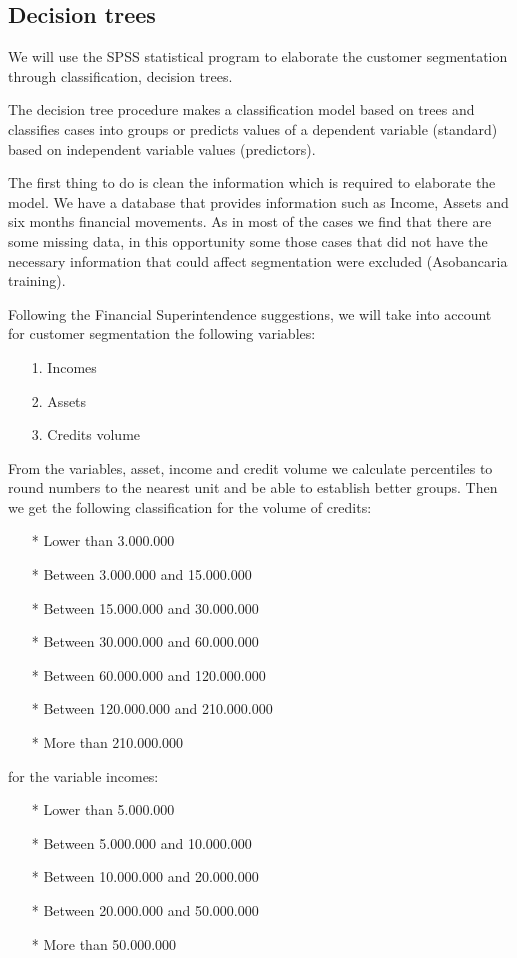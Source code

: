 \subsection{Decision trees}
We will use the SPSS statistical program to elaborate the customer segmentation through classification, decision trees.\par
The decision tree procedure makes a classification model based on trees and classifies cases into groups or predicts values of a dependent variable (standard) based on independent variable values (predictors).\par
The first thing to do is clean the information which is required to elaborate the model. We have a database that provides information such as Income, Assets and six months financial movements. As in most of the cases we find that there are some missing data, in this opportunity some those cases that did not have the necessary information that could affect segmentation were excluded (Asobancaria training).\par
Following the Financial Superintendence suggestions, we will take into account for customer segmentation the following variables:
\begin{itemize}
\item[1.] Incomes
\item[2.] Assets
\item[3.] Credits volume
\end{itemize}
From the variables, asset, income and credit volume we calculate percentiles to round numbers to the nearest unit and be able to establish better groups.
Then we get the following classification for the volume of credits:
\begin{itemize}
\item[*] Lower than 3.000.000
\item[*] Between 3.000.000 and 15.000.000
\item[*] Between 15.000.000 and 30.000.000
\item[*] Between 30.000.000 and 60.000.000
\item[*] Between 60.000.000 and 120.000.000
\item[*] Between 120.000.000 and 210.000.000
\item[*] More than 210.000.000
\end{itemize}
for the variable incomes:
\begin{itemize}
\item[*] Lower than 5.000.000
\item[*] Between 5.000.000 and 10.000.000
\item[*] Between 10.000.000 and 20.000.000
\item[*] Between 20.000.000 and 50.000.000
\item[*] More than 50.000.000
\end{itemize}
